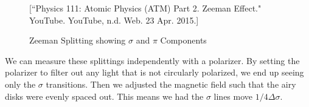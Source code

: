 \begin{figure}[tt]
  \begin{center}
  \end{center}
  \caption{Zeeman Splitting showing $\sigma$ and $\pi$ Components}[\footnotesize{``Physics 111: Atomic Physics (ATM) Part 2. Zeeman Effect." YouTube. YouTube, n.d. Web. 23 Apr. 2015.}]
  \label{Sigma and Pi}
\end{figure}

We can measure these splittings independently with a polarizer. By setting the polarizer to filter out any light that is not circularly polarized, we end up seeing only the $\sigma$ transitions. Then we adjusted the magnetic field such that the airy disks were evenly spaced out. This means we had the $\sigma$ lines move $1/4 \Delta \sigma$. 



